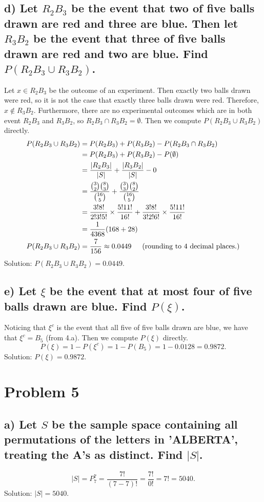 \documentclass[11pt, letterpaper]{article}
\begin{document}
\subsection*{d) \normalfont Let $R_2B_3$ be the event that two of five balls drawn are red and three are blue.
Then let $R_3B_2$ be the event that three of five balls drawn are red and two are blue. Find $P(R_2B_3\cup R_3B_2)$.}
Let $x\in R_2B_3$ be the outcome of an experiment. Then exactly two balls drawn were red, so it is not
the case that exactly three balls drawn were red. Therefore, $x\notin R_3B_2$. Furthermore, there are no
experimental outcomes which are in both event $R_2B_3$ and $R_3B_2$, so $R_2B_3\cap R_3B_2=\emptyset$.
Then we compute $P(R_2B_3\cup R_3B_2)$ directly.
\begin{align*}
    P(R_2B_3\cup R_3B_2)&=P(R_2B_3)+P(R_3B_2)-P(R_2B_3\cap R_3B_2)\\
    &=P(R_2B_3)+P(R_3B_2)-P(\emptyset)\\
    &=\frac{|R_2B_3|}{|S|}+\frac{|R_3B_2|}{|S|}-0\\
    &=\frac{{3 \choose 2}{8 \choose 3}}{{16 \choose 5}} + \frac{{3 \choose 3}{8 \choose 2}}{{16 \choose 5}}\\
    &=\frac{3!8!}{2!3!5!}\times\frac{5!11!}{16!}+\frac{3!8!}{3!2!6!}\times\frac{5!11!}{16!}\\
    &=\frac{1}{4368}(168+28)\\
    P(R_2B_3\cup R_3B_2)&=\frac{7}{156}\approx 0.0449 \text{\indent (rounding to 4 decimal places.)}
\end{align*}
Solution: $P(R_2B_3\cup R_3B_2)=0.0449$. 

\subsection*{e) \normalfont Let $\xi$ be the event that at most four of five balls drawn are blue. Find $P(\xi)$.}
Noticing that $\xi^c$ is the event that all five of five balls drawn are blue, we have that $\xi^c=B_5$ (from 4.a).
Then we compute $P(\xi)$ directly. 
\[P(\xi)=1-P(\xi^c)=1-P(B_5)=1-0.0128=0.9872.\]
Solution: $P(\xi)=0.9872$.

\section*{Problem 5}

\subsection*{a) \normalfont Let $S$ be the sample space containing all permutations of the letters in 
'ALBERTA', treating the A's as distinct. Find $|S|$.}
\[|S|=P^{7}_{7}=\frac{7!}{(7-7)!}=\frac{7!}{0!}=7!=5040.\]
Solution: $|S|=5040$. 
\end{document}
